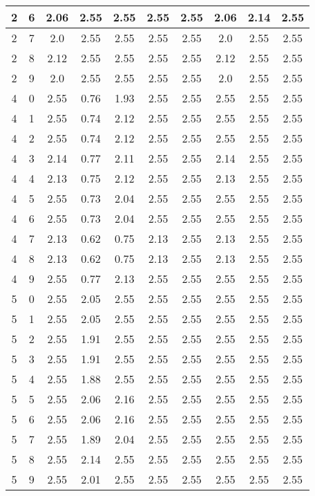 \begin{longtable}{|c|c||c||c|c|c|c||c|c|c|}
	2 & 6 & 2.06 & 2.55 & 2.55 & 2.55 & 2.55 & 2.06 & 2.14 & 2.55 \\ \hline
	2 & 7 & 2.0 & 2.55 & 2.55 & 2.55 & 2.55 & 2.0 & 2.55 & 2.55 \\ \hline
	2 & 8 & 2.12 & 2.55 & 2.55 & 2.55 & 2.55 & 2.12 & 2.55 & 2.55 \\ \hline
	2 & 9 & 2.0 & 2.55 & 2.55 & 2.55 & 2.55 & 2.0 & 2.55 & 2.55 \\ \hline
	4 & 0 & 2.55 & 0.76 & 1.93 & 2.55 & 2.55 & 2.55 & 2.55 & 2.55 \\ \hline
	4 & 1 & 2.55 & 0.74 & 2.12 & 2.55 & 2.55 & 2.55 & 2.55 & 2.55 \\ \hline
	4 & 2 & 2.55 & 0.74 & 2.12 & 2.55 & 2.55 & 2.55 & 2.55 & 2.55 \\ \hline
	4 & 3 & 2.14 & 0.77 & 2.11 & 2.55 & 2.55 & 2.14 & 2.55 & 2.55 \\ \hline
	4 & 4 & 2.13 & 0.75 & 2.12 & 2.55 & 2.55 & 2.13 & 2.55 & 2.55 \\ \hline
	4 & 5 & 2.55 & 0.73 & 2.04 & 2.55 & 2.55 & 2.55 & 2.55 & 2.55 \\ \hline
	4 & 6 & 2.55 & 0.73 & 2.04 & 2.55 & 2.55 & 2.55 & 2.55 & 2.55 \\ \hline
	4 & 7 & 2.13 & 0.62 & 0.75 & 2.13 & 2.55 & 2.13 & 2.55 & 2.55 \\ \hline
	4 & 8 & 2.13 & 0.62 & 0.75 & 2.13 & 2.55 & 2.13 & 2.55 & 2.55 \\ \hline
	4 & 9 & 2.55 & 0.77 & 2.13 & 2.55 & 2.55 & 2.55 & 2.55 & 2.55 \\ \hline
	5 & 0 & 2.55 & 2.05 & 2.55 & 2.55 & 2.55 & 2.55 & 2.55 & 2.55 \\ \hline
	5 & 1 & 2.55 & 2.05 & 2.55 & 2.55 & 2.55 & 2.55 & 2.55 & 2.55 \\ \hline
	5 & 2 & 2.55 & 1.91 & 2.55 & 2.55 & 2.55 & 2.55 & 2.55 & 2.55 \\ \hline
	5 & 3 & 2.55 & 1.91 & 2.55 & 2.55 & 2.55 & 2.55 & 2.55 & 2.55 \\ \hline
	5 & 4 & 2.55 & 1.88 & 2.55 & 2.55 & 2.55 & 2.55 & 2.55 & 2.55 \\ \hline
	5 & 5 & 2.55 & 2.06 & 2.16 & 2.55 & 2.55 & 2.55 & 2.55 & 2.55 \\ \hline
	5 & 6 & 2.55 & 2.06 & 2.16 & 2.55 & 2.55 & 2.55 & 2.55 & 2.55 \\ \hline
	5 & 7 & 2.55 & 1.89 & 2.04 & 2.55 & 2.55 & 2.55 & 2.55 & 2.55 \\ \hline
	5 & 8 & 2.55 & 2.14 & 2.55 & 2.55 & 2.55 & 2.55 & 2.55 & 2.55 \\ \hline
	5 & 9 & 2.55 & 2.01 & 2.55 & 2.55 & 2.55 & 2.55 & 2.55 & 2.55 \\ \hline

\end{longtable}
